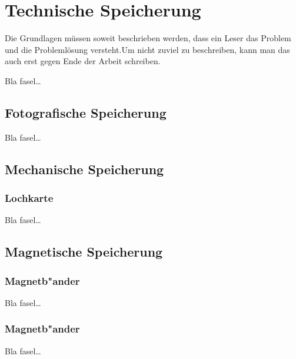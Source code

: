 
\chapter{Technische Speicherung}
\label{ch:Technische Speicherung}
Die Grundlagen müssen soweit beschrieben
werden, dass ein Leser das Problem und
die Problemlösung  versteht.Um nicht zuviel 
zu beschreiben, kann man das auch erst gegen 
Ende der Arbeit schreiben.

Bla fasel\ldots

\section{Fotografische Speicherung}
\label{ch:Grundlagen:sec:Fotografische Speicherung}

Bla fasel\ldots

\section{Mechanische Speicherung}
\label{ch:Grundlagen:sec:Mechanische Speicherung}
\subsection{Lochkarte}
\label{ch:Grundlagen:sec:Mechanische Speicherung:subsection:Lochkarte}
Bla fasel\ldots


\section{Magnetische Speicherung}
\label{ch:Grundlagen:sec:Magnetische Speicherung}
\subsection{Magnetb"ander}
\label{ch:Grundlagen:sec:Magnetische Speicherung:subsection:Magnetb"ander}

Bla fasel\ldots

\subsection{Magnetb"ander}
\label{ch:Grundlagen:sec:Magnetische Speicherung:subsection:Magnetb"ander}

Bla fasel\ldots


